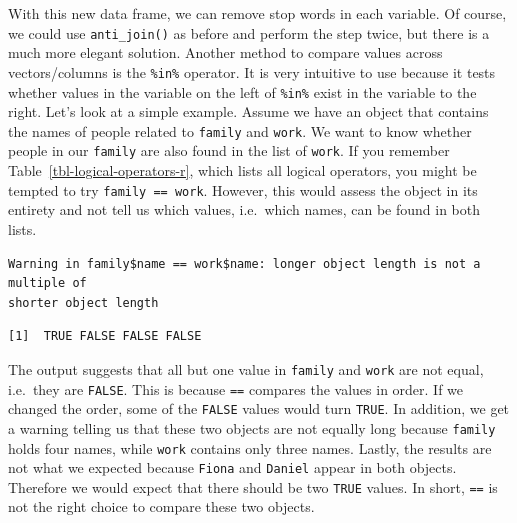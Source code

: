\documentclass[
  letterpaper,
]{krantz}
\makeatletter
\newenvironment{Shaded}{\begin{snugshade}}{\end{snugshade}}
\newcommand{\AttributeTok}[1]{\textcolor[rgb]{0.40,0.45,0.13}{#1}}
\newcommand{\CommentTok}[1]{\textcolor[rgb]{0.37,0.37,0.37}{#1}}
\newcommand{\FunctionTok}[1]{\textcolor[rgb]{0.28,0.35,0.67}{#1}}
\newcommand{\NormalTok}[1]{\textcolor[rgb]{0.00,0.23,0.31}{#1}}
\newcommand{\OtherTok}[1]{\textcolor[rgb]{0.00,0.23,0.31}{#1}}
\newcommand{\SpecialCharTok}[1]{\textcolor[rgb]{0.37,0.37,0.37}{#1}}
\newcommand{\StringTok}[1]{\textcolor[rgb]{0.13,0.47,0.30}{#1}}
\newenvironment{kframe}{%
\medskip{}
\setlength{\fboxsep}{.8em}
 \def\at@end@of@kframe{}%
 \ifinner\ifhmode%
  \def\at@end@of@kframe{\end{minipage}}%
  \begin{minipage}{\columnwidth}%
 \fi\fi%
 \def\FrameCommand##1{\hskip\@totalleftmargin \hskip-\fboxsep
 \colorbox{shadecolor}{##1}\hskip-\fboxsep
     \hskip-\linewidth \hskip-\@totalleftmargin \hskip\columnwidth}%
 \MakeFramed {\advance\hsize-\width
   \@totalleftmargin\z@ \linewidth\hsize
   \@setminipage}}%
 {\par\unskip\endMakeFramed%
 \at@end@of@kframe}
\renewenvironment{Shaded}{\begin{kframe}}{\end{kframe}}
\makeatother
\begin{document}
With this new data frame, we can remove stop words in each variable. Of
course, we could use \texttt{anti\_join()} as before and perform the
step twice, but there is a much more elegant solution. Another method to
compare values across vectors/columns is the \texttt{\%in\%} operator.
It is very intuitive to use because it tests whether values in the
variable on the left of \texttt{\%in\%} exist in the variable to the
right. Let's look at a simple example. Assume we have an object that
contains the names of people related to \texttt{family} and
\texttt{work}. We want to know whether people in our \texttt{family} are
also found in the list of \texttt{work}. If you remember
Table~\ref{tbl-logical-operators-r}, which lists all logical operators,
you might be tempted to try \texttt{family\ ==\ work}. However, this
would assess the object in its entirety and not tell us which values,
i.e.~which names, can be found in both lists.

\begin{Shaded}
\end{Shaded}

\begin{verbatim}
Warning in family$name == work$name: longer object length is not a multiple of
shorter object length
\end{verbatim}

\begin{verbatim}
[1]  TRUE FALSE FALSE FALSE
\end{verbatim}

The output suggests that all but one value in \texttt{family} and
\texttt{work} are not equal, i.e.~they are \texttt{FALSE}. This is
because \texttt{==} compares the values in order. If we changed the
order, some of the \texttt{FALSE} values would turn \texttt{TRUE}. In
addition, we get a warning telling us that these two objects are not
equally long because \texttt{family} holds four names, while
\texttt{work} contains only three names. Lastly, the results are not
what we expected because \texttt{Fiona} and \texttt{Daniel} appear in
both objects. Therefore we would expect that there should be two
\texttt{TRUE} values. In short, \texttt{==} is not the right choice to
compare these two objects.
\end{document}
